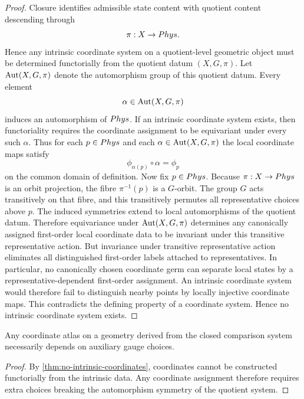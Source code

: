 \begin{proof}
	Closure identifies admissible state content with quotient content
	descending through
	\[
		\pi:X\to Phys.
	\]
	Hence any intrinsic coordinate system on a quotient-level geometric
	object must be determined functorially from the quotient datum
	\((X,G,\pi)\).
	Let \(\operatorname{Aut}(X,G,\pi)\) denote the automorphism group of this quotient
	datum.  Every element
	\[
		\alpha\in\operatorname{Aut}(X,G,\pi)
	\]
	induces an automorphism of \(Phys\).  If an intrinsic coordinate system
	exists, then functoriality requires the coordinate assignment to be
	equivariant under every such \(\alpha\).  Thus for each \(p\in Phys\)
	and each \(\alpha\in\operatorname{Aut}(X,G,\pi)\) the local coordinate maps satisfy
	\[
		\phi_{\alpha(p)}\circ \alpha = \phi_p
	\]
	on the common domain of definition.
	Now fix \(p\in Phys\).  Because \(\pi:X\to Phys\) is an orbit
	projection, the fibre \(\pi^{-1}(p)\) is a \(G\)-orbit.  The group \(G\)
	acts transitively on that fibre, and this transitively permutes all
	representative choices above \(p\).  The induced symmetries extend to
	local automorphisms of the quotient datum.  Therefore equivariance under
	\(\operatorname{Aut}(X,G,\pi)\) determines any canonically assigned first-order local
	coordinate data to be invariant under this transitive representative
	action.
	But invariance under transitive representative action eliminates all
	distinguished first-order labels attached to representatives.  In
	particular, no canonically chosen coordinate germ can separate local
	states by a representative-dependent first-order assignment.  An
	intrinsic coordinate system would therefore fail to distinguish nearby
	points by locally injective coordinate maps.
	This contradicts the defining property of a coordinate system.
	Hence no intrinsic coordinate system exists.
\end{proof}
\begin{corollary}
	Any coordinate atlas on a geometry derived from the closed comparison
	system necessarily depends on auxiliary gauge choices.
\end{corollary}
\begin{proof}
	By \cref{thm:no-intrinsic-coordinates}, coordinates cannot be
	constructed functorially from the intrinsic data.  Any coordinate
	assignment therefore requires extra choices breaking the automorphism
	symmetry of the quotient system.
\end{proof}
